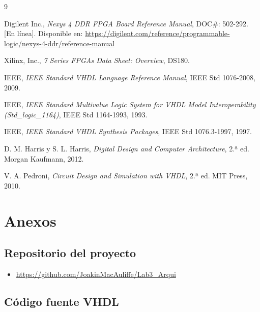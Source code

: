 \documentclass[letterpaper,12pt]{article}
\begin{document}
\newpage
\begin{thebibliography}{9}

Digilent Inc., \emph{Nexys 4 DDR FPGA Board Reference Manual}, DOC\#: 502-292. [En línea]. Disponible en: \url{https://digilent.com/reference/programmable-logic/nexys-4-ddr/reference-manual}

Xilinx, Inc., \emph{7 Series FPGAs Data Sheet: Overview}, DS180.

IEEE, \emph{IEEE Standard VHDL Language Reference Manual}, IEEE Std 1076-2008, 2009.

IEEE, \emph{IEEE Standard Multivalue Logic System for VHDL Model Interoperability (Std\_logic\_1164)}, IEEE Std 1164-1993, 1993.

IEEE, \emph{IEEE Standard VHDL Synthesis Packages}, IEEE Std 1076.3-1997, 1997.

D. M. Harris y S. L. Harris, \emph{Digital Design and Computer Architecture}, 2.ª ed. Morgan Kaufmann, 2012.

V. A. Pedroni, \emph{Circuit Design and Simulation with VHDL}, 2.ª ed. MIT Press, 2010.

\end{thebibliography}

\newpage
\section{Anexos}

\subsection{Repositorio del proyecto}

\begin{itemize}
    \item \url{https://github.com/JoakinMacAuliffe/Lab3_Arqui}
\end{itemize}

\subsection{Código fuente VHDL}
\end{document}
